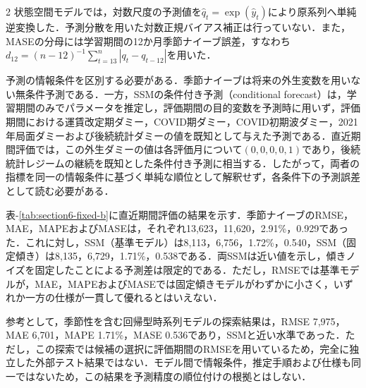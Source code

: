\documentclass[uplatex,a4paper,10pt]{jsarticle}
\begin{document}
\begin{multicols}{2}
状態空間モデルでは，対数尺度の予測値を$\widehat{q}_t=\exp(\widehat{y}_t)$により原系列へ単純逆変換した．予測分散を用いた対数正規バイアス補正は行っていない．また，MASEの分母には学習期間の12か月季節ナイーブ誤差，すなわち$d_{12}=(n-12)^{-1}\sum_{t=13}^{n}|q_t-q_{t-12}|$を用いた\cite{hyndman2006}．

予測の情報条件を区別する必要がある．季節ナイーブは将来の外生変数を用いない無条件予測である．一方，SSMの条件付き予測（conditional forecast）は，学習期間のみでパラメータを推定し，評価期間の目的変数を予測時に用いず，評価期間における運賃改定期ダミー，COVID期ダミー，COVID初期波ダミー，2021年局面ダミーおよび後続統計ダミーの値を既知として与えた予測である．直近期間評価では，この外生ダミーの値は各評価月について$(0,0,0,0,1)$であり，後続統計レジームの継続を既知とした条件付き予測に相当する．したがって，両者の指標を同一の情報条件に基づく単純な順位として解釈せず，各条件下の予測誤差として読む必要がある．

表-\ref{tab:section6-fixed-b}に直近期間評価の結果を示す．季節ナイーブのRMSE，MAE，MAPEおよびMASEは，それぞれ13,623，11,620，2.91\%，0.929であった．これに対し，SSM（基準モデル）は8,113，6,756，1.72\%，0.540，SSM（固定傾き）は8,135，6,729，1.71\%，0.538である．両SSMは近い値を示し，傾きノイズを固定したことによる予測差は限定的である．ただし，RMSEでは基準モデルが，MAE，MAPEおよびMASEでは固定傾きモデルがわずかに小さく，いずれか一方の仕様が一貫して優れるとはいえない．

参考として，季節性を含む回帰型時系列モデルの探索結果は，RMSE 7,975，MAE 6,701，MAPE 1.71\%，MASE 0.536であり，SSMと近い水準であった．ただし，この探索では候補の選択に評価期間のRMSEを用いているため，完全に独立した外部テスト結果ではない．モデル間で情報条件，推定手順および仕様も同一ではないため，この結果を予測精度の順位付けの根拠とはしない．


\end{multicols}
\end{document}
